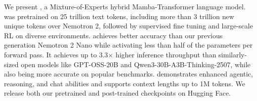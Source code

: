\normalsize
We present \ourfinalmodel, a Mixture-of-Experts hybrid Mamba-Transformer language model. \ourmodel was pretrained on 25 trillion text tokens, including more than 3 trillion new unique tokens over Nemotron 2, followed by supervised fine tuning and large-scale RL on diverse environments. \ourmodel achieves better accuracy than our previous generation Nemotron 2 Nano while activating less than half of the parameters per forward pass. It achieves up to 3.3$\times$ higher inference throughput than similarly-sized open models like GPT-OSS-20B and Qwen3-30B-A3B-Thinking-2507, while also being more accurate on popular benchmarks. \ourmodel demonstrates enhanced agentic, reasoning, and chat abilities and supports context lengths up to 1M tokens. We release both our pretrained \ourbasemodel and post-trained \ourfinalmodel checkpoints on Hugging Face.